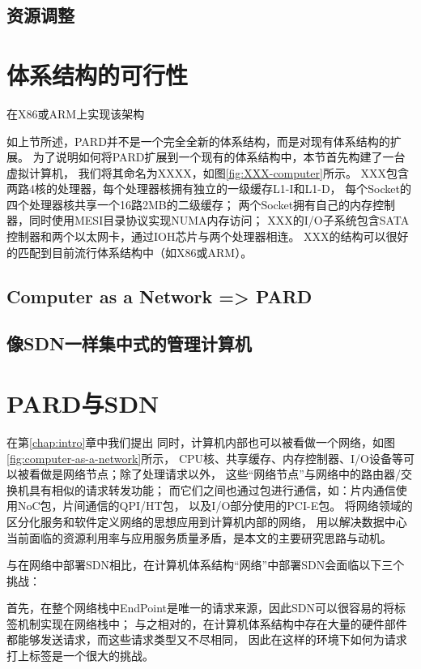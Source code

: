 \subsection{资源调整}

\section{体系结构的可行性}

在X86或ARM上实现该架构


如上节所述，PARD并不是一个完全全新的体系结构，而是对现有体系结构的扩展。
为了说明如何将PARD扩展到一个现有的体系结构中，本节首先构建了一台虚拟计算机，
我们将其命名为XXXX，如图\ref{fig:XXX-computer}所示。
XXX包含两路4核的处理器，每个处理器核拥有独立的一级缓存L1-I和L1-D，
每个Socket的四个处理器核共享一个16路2MB的二级缓存；
两个Socket拥有自己的内存控制器，同时使用MESI目录协议实现NUMA内存访问；
XXX的I/O子系统包含SATA控制器和两个以太网卡，通过IOH芯片与两个处理器相连。
XXX的结构可以很好的匹配到目前流行体系结构中（如X86或ARM）。

\subsection{Computer as a Network => PARD}

\subsection{像SDN一样集中式的管理计算机}

\section{PARD与SDN}

在第\ref{chap:intro}章中我们提出
同时，计算机内部也可以被看做一个网络，如图\ref{fig:computer-as-a-network}所示，
CPU核、共享缓存、内存控制器、I/O设备等可以被看做是网络节点；除了处理请求以外，
这些“网络节点”与网络中的路由器/交换机具有相似的请求转发功能；
而它们之间也通过包进行通信，如：片内通信使用NoC包，片间通信的QPI/HT包，
以及I/O部分使用的PCI-E包。
将网络领域的区分化服务和软件定义网络的思想应用到计算机内部的网络，
用以解决数据中心当前面临的资源利用率与应用服务质量矛盾，是本文的主要研究思路与动机。

与在网络中部署SDN相比，在计算机体系结构“网络”中部署SDN会面临以下三个挑战：

首先，在整个网络栈中EndPoint是唯一的请求来源，因此SDN可以很容易的将标签机制实现在网络栈中；
与之相对的，在计算机体系结构中存在大量的硬件部件都能够发送请求，而这些请求类型又不尽相同，
因此在这样的环境下如何为请求打上标签是一个很大的挑战。

